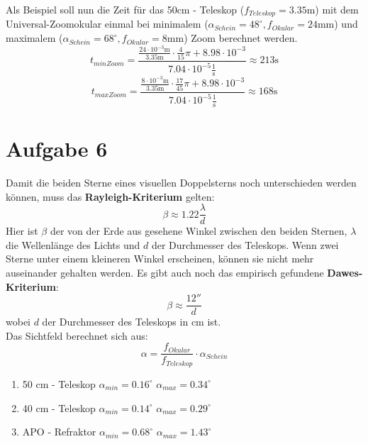 Als Beispiel soll nun die Zeit für das 50cm - Teleskop ($f_{Teleskop} = 3.35\mathrm{m}$) mit dem Universal-Zoomokular einmal bei minimalem ($\alpha_{Schein}=48^{\circ}, f_{Okular} = 24 \mathrm{mm}$) und maximalem ($\alpha_{Schein}=68^{\circ}, f_{Okular} = 8 \mathrm{mm}$) Zoom berechnet werden.
\begin{equation}
t_{minZoom} = \frac{\frac{24 \cdot 10^{-3} \mathrm{m}}{3.35 \mathrm{m}}\cdot \frac{4}{15}\pi + 8.98 \cdot 10^{-3}}{7.04\cdot 10^{-5} \frac{1}{\mathrm{s}}} \approx 213 \mathrm{s}
\end{equation}
\begin{equation}
t_{maxZoom} = \frac{\frac{8 \cdot 10^{-3} \mathrm{m}}{3.35 \mathrm{m}}\cdot \frac{17}{45}\pi + 8.98 \cdot 10^{-3}}{7.04\cdot 10^{-5} \frac{1}{\mathrm{s}}} \approx 168 \mathrm{s}
\end{equation}

\section{Aufgabe 6}
Damit die beiden Sterne eines visuellen Doppelsterns noch unterschieden werden können, muss das \textbf{Rayleigh-Kriterium} gelten:
\begin{equation}
\beta \approx 1.22\frac{\lambda}{d}
\end{equation}
Hier ist $\beta$ der von der Erde aus gesehene Winkel zwischen den beiden Sternen, $\lambda$ die Wellenlänge des Lichts und $d$ der Durchmesser des Teleskops. Wenn zwei Sterne unter einem kleineren Winkel erscheinen, können sie nicht mehr auseinander gehalten werden.
Es gibt auch noch das empirisch gefundene \textbf{Dawes-Kriterium}:
\begin{equation}
\beta \approx \frac{12''}{d}
\end{equation}
wobei $d$ der Durchmesser des Teleskops in cm ist.
\\
Das Sichtfeld berechnet sich aus:
\begin{equation}
\alpha = \frac{f_{Okular}}{f_{Teleskop}}\cdot \alpha_{Schein}
\end{equation}
\begin{enumerate}
\item
50 cm - Teleskop
$\alpha_{min} = 0.16^{\circ}$
$\alpha_{max} = 0.34^{\circ}$
\item
40 cm - Teleskop
$\alpha_{min} = 0.14^{\circ}$
$\alpha_{max} = 0.29^{\circ}$
\item
APO - Refraktor
$\alpha_{min} = 0.68^{\circ}$
$\alpha_{max} = 1.43^{\circ}$
\end{enumerate}